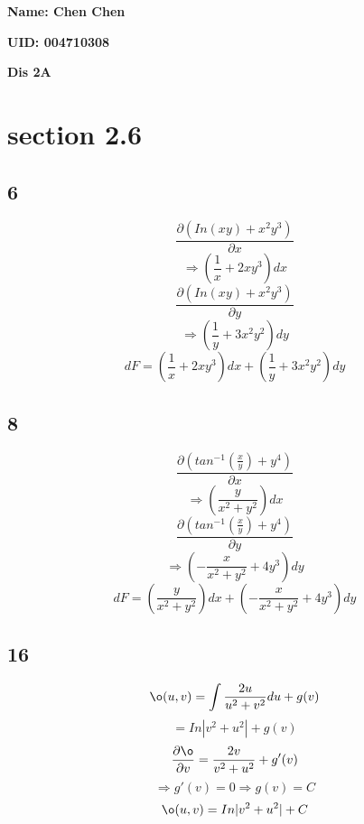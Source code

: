\documentclass[12pt, a4paper]{IEEEtran}
\begin{document}
    \centerline{\textbf{Name: Chen Chen}}
    \centerline{\textbf{UID: 004710308}}
    \centerline{\textbf{Dis 2A}}


    \section*{section 2.6}
\subsection*{6}
$$\frac{\partial (In(xy)+x^2 y^3)}{\partial x}$$
$$\Rightarrow (\frac{1}{x}+2xy^3)dx$$
$$\frac{\partial (In(xy)+x^2 y^3)}{\partial y}$$
$$\Rightarrow (\frac{1}{y}+3x^2y^2)dy$$
$$dF=(\frac{1}{x}+2xy^3)dx+(\frac{1}{y}+3x^2y^2)dy$$


\subsection*{8}
$$\frac{\partial (tan^{-1}(\frac{x}{y})+y^4)}{\partial x}$$
$$\Rightarrow (\frac{y}{x^2+y^2})dx$$
$$\frac{\partial (tan^{-1}(\frac{x}{y})+y^4)}{\partial y}$$
$$\Rightarrow (-\frac{x}{x^2+y^2}+4y^3)dy$$
$$dF=(\frac{y}{x^2+y^2})dx+(-\frac{x}{x^2+y^2}+4y^3)dy$$

\subsection*{16}
$$\o(u,v)=\int \frac{2u}{u^2+v^2}du + g(v)$$
$$=In|v^2+u^2|+g(v)$$
$$\frac{\partial \o}{\partial v}=\frac{2v}{v^2+u^2}+g'(v)$$
$$\Rightarrow g'(v)=0 \Rightarrow g(v)=C$$
$$\o (u,v)=In|v^2+u^2|+C$$
\end{document}
